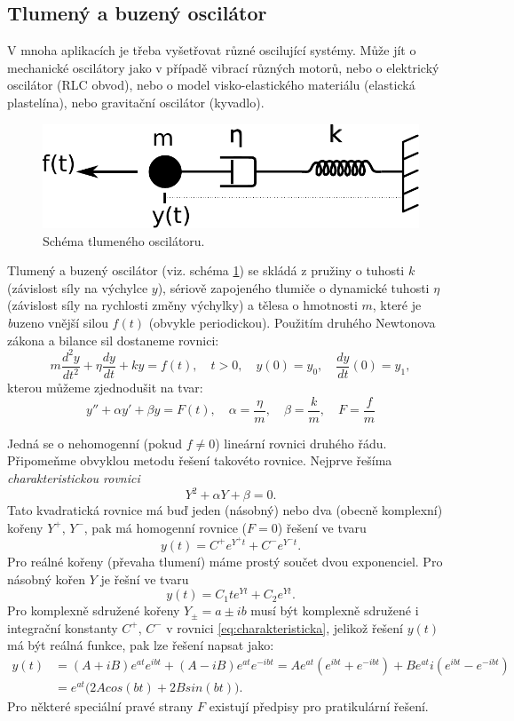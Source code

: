 \documentclass[a4paper, 12pt]{book}
\theoremstyle{definition}
\def\df#1{\emph{#1}}
\begin{document}
\subsection{Tlumený a buzený oscilátor}
\label{sec::oscilator}
V mnoha aplikacích je třeba vyšetřovat různé oscilující systémy. Může jít o mechanické oscilátory jako v případě 
vibrací různých motorů, nebo o elektrický oscilátor (RLC obvod), nebo o model visko-elastického materiálu (elastická plastelína), nebo gravitační oscilátor (kyvadlo).
\begin{figure}[h]
\label{fig:oscilator}
\begin{center}
\includegraphics[scale=0.4]{maxwell_diagram.pdf}
\caption{Schéma tlumeného oscilátoru.}
\end{center}
\end{figure}
Tlumený a buzený oscilátor (viz. schéma \ref{fig:oscilator}) se skládá z pružiny o tuhosti $k$ (závislost síly na výchylce $y$),
sériově zapojeného tlumiče o dynamické tuhosti $\eta$ (závislost síly na rychlosti změny výchylky) a tělesa o hmotnosti $m$, které je {\emph buzeno} vnější silou $f(t)$
(obvykle periodickou). 
Použitím druhého Newtonova zákona a bilance sil dostaneme rovnici:
\[
 m\frac{d^2y}{dt^2}+\eta \frac{dy}{dt}+ky=f(t),\quad t>0,\quad y(0)=y_0,\quad \frac{dy}{dt}(0) = y_1,
\]
kterou můžeme zjednodušit na tvar:
\[
  y'' + \alpha y' + \beta y = F(t),\quad \alpha=\frac{\eta}{m},\quad  \beta=\frac{k}{m},\quad F=\frac{f}{m}
\]

Jedná se o nehomogenní (pokud $f\ne 0$) lineární rovnici druhého řádu. Připomeňme obvyklou metodu řešení takovéto rovnice.
Nejprve řešíma \df{charakteristickou rovnici}
\[
  Y^2 + \alpha Y + \beta =0.
\]
Tato kvadratická rovnice má buď jeden (násobný) nebo dva (obecně komplexní) kořeny $Y^+$, $Y^-$, pak má homogenní rovnice ($F=0$) řešení ve tvaru
\begin{equation}
   \label{eq:charakteristicka}
   y(t) = C^{+}e^{Y^{+} t} + C^{-}e^{Y^{-} t}.
\end{equation}
Pro reálné kořeny (převaha tlumení) máme prostý součet dvou exponenciel. Pro násobný kořen $Y$ je řešní ve tvaru
\[
  y(t) = C_1 t e^{Yt} + C_2 e^{Yt}.
\]
Pro komplexně sdružené kořeny $Y_{\pm} = a \pm i b$ musí být komplexně sdružené i integrační konstanty $C^{+}$, $C^{-}$ v rovnici \eqref{eq:charakteristicka}, jelikož
řešení $y(t)$ má být reálná funkce, pak lze řešení napsat jako:
\begin{align*}
   y(t) &= (A + i B) e^{at} e^{ibt} + (A-iB)e^{at}e^{-ibt} = A e^{at} (e^{ibt} + e^{-ibt}) + B e^{at} i(e^{ibt} - e^{-ibt}) \\
   &= e^{at}\big( 2 A cos(bt) + 2 B sin(bt) \big).
\end{align*}
Pro některé speciální pravé strany $F$ existují předpisy pro pratikulární řešení.
\end{document}
